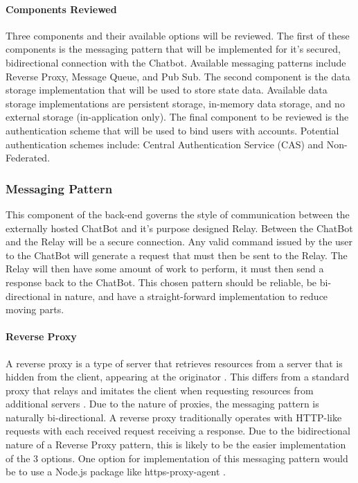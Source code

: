 \paragraph{Components Reviewed}
Three components and their available options will be reviewed.
The first of these components is the messaging pattern that will be implemented for it's secured, bidirectional connection with the Chatbot.
Available messaging patterns include Reverse Proxy, Message Queue, and Pub Sub.
The second component is the data storage implementation that will be used to store state data.
Available data storage implementations are persistent storage, in-memory data storage, and no external storage (in-application only).
The final component to be reviewed is the authentication scheme that will be used to bind users with accounts.
Potential authentication schemes include: Central Authentication Service (CAS) and Non-Federated.

\subsubsection{Messaging Pattern}
This component of the back-end governs the style of communication between the externally hosted ChatBot and it's purpose designed Relay.
Between the ChatBot and the Relay will be a secure connection.
Any valid command issued by the user to the ChatBot will generate a request that must then be sent to the Relay.
The Relay will then have some amount of work to perform, it must then send a response back to the ChatBot.
This chosen pattern should be reliable, be bi-directional in nature, and have a straight-forward implementation to reduce moving parts.

\paragraph{Reverse Proxy}
A reverse proxy is a type of server that retrieves resources from a server that is hidden from the client, appearing at the originator \cite{rproxy}.
This differs from a standard proxy that relays and imitates the client when requesting resources from additional servers \cite{apacheproxy}.
Due to the nature of proxies, the messaging pattern is naturally bi-directional.
A reverse proxy traditionally operates with HTTP-like requests \cite{rproxy} with each received request receiving a response.
Due to the bidirectional nature of a Reverse Proxy pattern, this is likely to be the easier implementation of the 3 options.
One option for implementation of this messaging pattern would be to use a Node.js package like https-proxy-agent \cite{npmproxy}.

